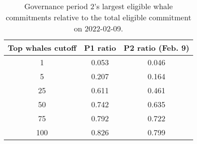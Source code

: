 %
\begin{longtable}[c]{ c c c }
\caption{Governance period 2's largest eligible whale commitments relative to the total eligible commitment on 2022-02-09.} \\
\hline
\textbf{Top whales cutoff} & \textbf{P1 ratio} & \textbf{P2 ratio (Feb. 9)} \\
\hline
1 & 0.053 & 0.046 \\ 
5 & 0.207 & 0.164 \\ 
25 & 0.611 & 0.461 \\ 
50 & 0.742 & 0.635 \\ 
75 & 0.792 & 0.722 \\ 
100 & 0.826 & 0.799 \\ 
\hline 
\end{longtable} 
